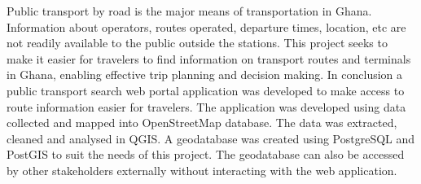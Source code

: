 

\begin{abstracts}        %
Public transport by road is the major means of transportation in Ghana. Information about operators, routes operated, departure times, location, etc are not readily available to the public outside the stations. This project seeks to make it easier for travelers to find information on transport routes and terminals in Ghana, enabling effective trip planning and decision making. In conclusion a public transport search web portal application was developed to make access to route information easier for travelers. The application was developed using data collected and mapped into OpenStreetMap database. The data was extracted, cleaned and analysed in QGIS.  A geodatabase  was created using PostgreSQL and PostGIS to suit the needs of this project. The geodatabase can also be accessed by other stakeholders externally without interacting with the web application.
\end{abstracts}


